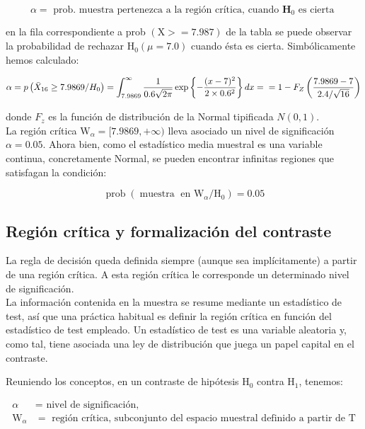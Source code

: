 \documentclass[
]{article}
\begin{document}
\[
\alpha=\text { prob. muestra pertenezca a la región crítica, cuando } \mathbf{H}_{0} \text { es cierta }
\]

en la fila correspondiente a prob \((\mathrm{X}>=7.987)\) de la tabla se puede observar la probabilidad de rechazar \(\mathrm{H}_{0}(\mu=7.0)\) cuando ésta es cierta. Simbólicamente hemos calculado:

\[
\alpha=p\left(\bar{X}_{16} \geq 7.9869 / H_{0}\right)=\int_{7.9869}^{\infty} \frac{1}{0.6 \sqrt{2 \pi}} \exp \left\{-\frac{(x-7)^{2}}{2 \times 0.6^{2}}\right\} d x=\\ = 1-F_{Z}\left(\frac{7.9869-7}{2.4 / \sqrt{16}}\right)
\]

donde \(F_{z}\) es la función de distribución de la Normal tipificada \(N(0,1)\).\\
La región crítica \(\mathrm{W}_{\alpha}=[7.9869,+\infty)\) lleva asociado un nivel de significación \(\alpha=0.05\). Ahora bien, como el estadístico media muestral es una variable continua, concretamente Normal, se pueden encontrar infinitas regiones que satisfagan la condición:

\[
\operatorname{prob}\left(\operatorname{muestra} \text { en } \mathrm{W}_{\alpha} / \mathrm{H}_{0}\right)=0.05
\]

\subsection{Región crítica y formalización del contraste}\label{regiuxf3n-cruxedtica-y-formalizaciuxf3n-del-contraste}

La regla de decisión queda definida siempre (aunque sea implícitamente) a partir de una región crítica. A esta región crítica le corresponde un determinado nivel de significación.\\
La información contenida en la muestra se resume mediante un estadístico de test, así que una práctica habitual es definir la región crítica en función del estadístico de test empleado. Un estadístico de test es una variable aleatoria y, como tal, tiene asociada una ley de distribución que juega un papel capital en el contraste.

Reuniendo los conceptos, en un contraste de hipótesis \(\mathrm{H}_{0}\) contra \(\mathrm{H}_{1}\), tenemos:

\[
\begin{aligned}
\alpha & =\text { nivel de significación, } \\
\mathrm{W}_{\alpha} & =\text { región crítica, subconjunto del espacio muestral definido a partir de } \mathrm{T}
\end{aligned}
\]
\end{document}
